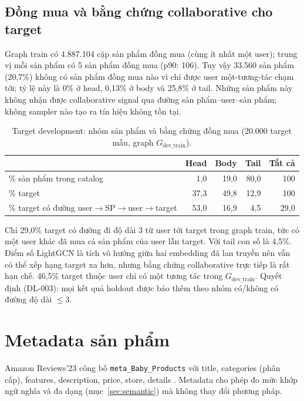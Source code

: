 \documentclass[11pt,a4paper,oneside]{report}
\begin{document}
\subsection*{Đồng mua và bằng chứng collaborative cho target}
Graph train có 4.887.104 cặp sản phẩm đồng mua (cùng ít nhất một user); trung vị mỗi sản phẩm có 5 sản phẩm đồng mua (p90: 106). Tuy vậy 33.560 sản phẩm (20,7\%) không có sản phẩm đồng mua nào vì chỉ được user một-tương-tác chạm tới; tỷ lệ này là 0\% ở head, 0,13\% ở body và 25,8\% ở tail. Những sản phẩm này không nhận được collaborative signal qua đường sản phẩm--user--sản phẩm; không sampler nào tạo ra tín hiệu không tồn tại.

\begin{table}[h]
\centering\small
\caption{Target development: nhóm sản phẩm và bằng chứng đồng mua (20.000 target mẫu, graph $G_{\text{dev\_train}}$).}\label{tab:reach}
\begin{tabular}{lrrrr}
\toprule
 & Head & Body & Tail & Tất cả \\
\midrule
\% sản phẩm trong catalog & 1,0 & 19,0 & 80,0 & 100 \\
\% target & 37,3 & 49,8 & 12,9 & 100 \\
\% target có đường user$\rightarrow$SP$\rightarrow$user$\rightarrow$target & 53,0 & 16,9 & 4,5 & 29,0 \\
\bottomrule
\end{tabular}
\end{table}
Chỉ 29,0\% target có đường đi độ dài 3 từ user tới target trong graph train, tức có một user khác đã mua cả sản phẩm của user lẫn target. Với tail con số là 4,5\%. Điểm số LightGCN là tích vô hướng giữa hai embedding đã lan truyền nên vẫn có thể xếp hạng target xa hơn, nhưng bằng chứng collaborative trực tiếp là rất hạn chế. 46,5\% target thuộc user chỉ có một tương tác trong $G_{\text{dev\_train}}$. Quyết định (DL-003): mọi kết quả holdout được báo thêm theo nhóm có/không có đường độ dài $\le$3.

\section{Metadata sản phẩm}
Amazon Reviews'23 công bố \texttt{meta\_Baby\_Products} với title, categories (phân cấp), features, description, price, store, details \cite{amazon23}. Metadata cho phép đo mức khớp ngữ nghĩa và đa dạng (mục~\ref{sec:semantic}) mà không thay đổi phương pháp.
\end{document}
